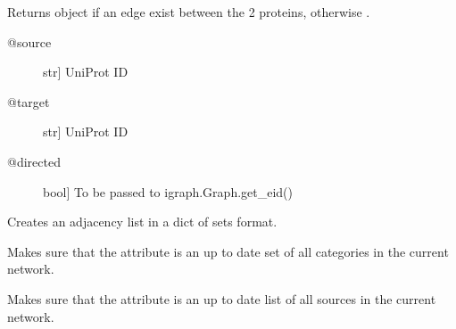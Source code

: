 \documentclass[letterpaper,10pt,english]{sphinxmanual}
\begin{document}
\begin{fulllineitems}

\begin{fulllineitems}
\label{\detokenize{main:pypath.main.PyPath.up_edge}}
Returns  object if an edge exist between
the 2 proteins, otherwise .
\begin{description}
\item[{@source}] \leavevmode{[}str{]}
UniProt ID

\item[{@target}] \leavevmode{[}str{]}
UniProt ID

\item[{@directed}] \leavevmode{[}bool{]}
To be passed to igraph.Graph.get\_eid()

\end{description}

\end{fulllineitems}


\begin{fulllineitems}
\label{\detokenize{main:pypath.main.PyPath.update_adjlist}}
Creates an adjacency list in a dict of sets format.

\end{fulllineitems}


\begin{fulllineitems}
\label{\detokenize{main:pypath.main.PyPath.update_cats}}
Makes sure that the  attribute is an up to date
set of all categories in the current network.

\end{fulllineitems}


\begin{fulllineitems}
\label{\detokenize{main:pypath.main.PyPath.update_sources}}
Makes sure that the  attribute is an up to date
list of all sources in the current network.


\end{fulllineitems}
\end{fulllineitems}
\end{document}

